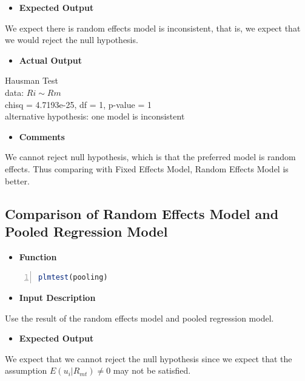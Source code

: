     \begin{itemize}
    \item \textbf{Expected Output}
    \end{itemize}
    We expect there is random effects model is inconsistent, that is, we expect that we would reject the null hypothesis.\\

    \begin{itemize}
    \item \textbf{Actual Output}
    \end{itemize}
    Hausman Test\\
    data:  $Ri \sim Rm$\\
    chisq = 4.7193e-25, df = 1, p-value = 1\\
    alternative hypothesis: one model is inconsistent\\


    \begin{itemize}
    \item \textbf{Comments}
    \end{itemize}
    We cannot reject null hypothesis, which is that the preferred model is random effects. Thus comparing with Fixed Effects Model, Random Effects Model is better.\\

    \subsection{Comparison of Random Effects Model and Pooled Regression Model}
    \begin{itemize}
    \item \textbf{Function}
    \end{itemize}
    \begin{lstlisting}[language=R,numbers=left, numberstyle=\normalsize]
    plmtest(pooling)
    \end{lstlisting}
    \begin{itemize}
    \item \textbf{Input Description}
    \end{itemize}
    Use the result of the random effects model and pooled regression model.\\

    \begin{itemize}
    \item \textbf{Expected Output}
    \end{itemize}
    We expect that we cannot reject the null hypothesis since we expect that the assumption $E(u_i|R_{mt})\neq 0$ may not be satisfied.\\

